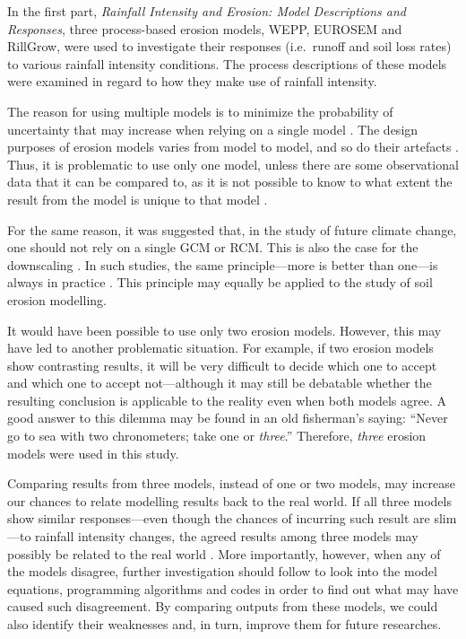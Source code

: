 
In the first part, \textsl{Rainfall Intensity and Erosion: Model Descriptions
and Responses}, three process-based erosion models, WEPP, EUROSEM and RillGrow,
were used to investigate their responses (i.e.\ runoff and soil loss rates) to
various rainfall intensity conditions. The process descriptions of these models
were examined in regard to how they make use of rainfall intensity.

The reason for using multiple models is to minimize the probability of
uncertainty that may increase when relying on a single model
\citep{ipcc2001-881}. The design purposes of erosion models varies from
model to
model, and so do their artefacts \citep{favis-mortlock1998-141,jetten1999-521}.
Thus, it is problematic to use only one model, unless there are some
observational data that it can be compared to, as it is not possible to know to
what extent the result from the model is unique to that model
\citep{favis-mortlock1998-141,jetten1999-521}.

For the same reason, it was suggested that, in the study of future climate
change, one should not rely on a single GCM or RCM. This is also the case for
the downscaling \citep{mearns2003,wilby2004}. In such studies, the same
principle---more is better than one---is always in practice \citep{wilby2004}.
This principle may equally be applied to the study of soil erosion modelling.

It would have been possible to use only two erosion models. However, this may
have led to another problematic situation. For example, if two erosion models
show contrasting results, it will be very difficult to decide which one to
accept and which one to accept not---although it may still be debatable
whether the resulting conclusion is applicable to the reality even when both
models agree. A good answer to this dilemma may be found in an old fisherman's
saying: ``Never go to sea with two chronometers; take one or \emph{three}.''
Therefore, \emph{three} erosion models were used in this study.

Comparing results from three models, instead of one or two models, may increase
our chances to relate modelling results back to the real world.
If all three models show similar responses---even though the chances of
incurring such result are slim---to rainfall intensity changes, the agreed
results among three models may possibly be related to the real world
\citep{araujo2007-42}.
More importantly, however, when any of the models disagree, further
investigation should follow to look into the model equations, programming
algorithms and codes in order to find out what may have caused such
disagreement. By comparing outputs from these models, we could also identify
their weaknesses and, in turn, improve them for future researches.

